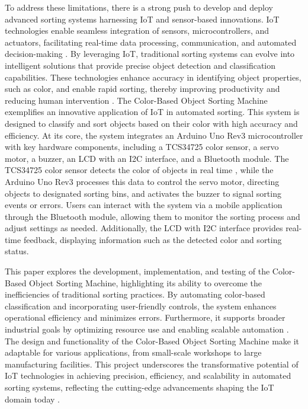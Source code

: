 \documentclass[conference, onecolumn]{IEEEtran}
\begin{document}
To address these limitations, there is a strong push to develop and deploy advanced sorting systems harnessing IoT and sensor-based innovations. IoT technologies enable seamless integration of sensors, microcontrollers, and actuators, facilitating real-time data processing, communication, and automated decision-making \cite{patel2022color}. By leveraging IoT, traditional sorting systems can evolve into intelligent solutions that provide precise object detection and classification capabilities. These technologies enhance accuracy in identifying object properties, such as color, and enable rapid sorting, thereby improving productivity and reducing human intervention \cite{singh2022machine}. The Color-Based Object Sorting Machine exemplifies an innovative application of IoT in automated sorting. This system is designed to classify and sort objects based on their color with high accuracy and efficiency. At its core, the system integrates an Arduino Uno Rev3 microcontroller with key hardware components, including a TCS34725 color sensor, a servo motor, a buzzer, an LCD with an I2C interface, and a Bluetooth module. The TCS34725 color sensor detects the color of objects in real time \cite{lee2018sensors}, while the Arduino Uno Rev3 processes this data to control the servo motor, directing objects to designated sorting bins, and activates the buzzer to signal sorting events or errors. Users can interact with the system via a mobile application through the Bluetooth module, allowing them to monitor the sorting process and adjust settings as needed. Additionally, the LCD with I2C interface provides real-time feedback, displaying information such as the detected color and sorting status.

This paper explores the development, implementation, and testing of the Color-Based Object Sorting Machine, highlighting its ability to overcome the inefficiencies of traditional sorting practices. By automating color-based classification and incorporating user-friendly controls, the system enhances operational efficiency and minimizes errors. Furthermore, it supports broader industrial goals by optimizing resource use and enabling scalable automation \cite{johnson2021sorting}. The design and functionality of the Color-Based Object Sorting Machine make it adaptable for various applications, from small-scale workshops to large manufacturing facilities. This project underscores the transformative potential of IoT technologies in achieving precision, efficiency, and scalability in automated sorting systems, reflecting the cutting-edge advancements shaping the IoT domain today \cite{patel2022iot, sharma2021automated}.
\end{document}
